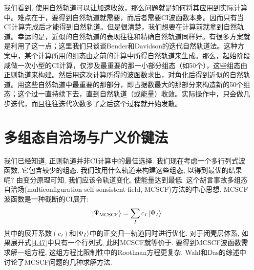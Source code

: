 我们看到, 使用自然轨道可以让加速收敛，那么问题就是如何将其应用到实际计算中。难点在于，要得到自然轨道就需要，而后者需要CI波函数本身。因而只有当CI计算完成后才能得到自然轨道。但是很清楚，我们想要在计算前就拿到自然轨道。幸运的是，近似的自然轨道的表现往往和精确自然轨道同样好。有很多方案就是利用了这一点；这里我们只谈谈Bender和Davidson的迭代自然轨道法。这种方案中，某个计算所用的组态由之前的计算中所得自然轨道来生成。那么，起始阶段咸做一次小型的CI计算，仅涉及最重要的那一小部分组态（如50个），这些组态由正则\hft 轨道来构建。然后用这次计算所得的波函数求出，对角化后得到近似的自然轨道。用这些自然轨道中最重要的那部分，即占据数最大的那部分来构造新的50个组态；这个过一直持续下去，直到自然轨道（或能量）收敛。实际操作中，只会做几步迭代，而且往往迭代次数多了之后这个过程就开始发散。
\section{多组态自洽场与广义价键法}
我们已经知道, 正则\hft 轨道并非CI计算中的最佳选择. 我们现在考虑一个多行列式波函数, 它包含较少的组态. 我们改用什么轨道来构建这些组态, 以得到最优的结果呢? 由变分原理可知, 我们应该令轨道变化, 使能量达到最低. 这个胡言事故多组态自洽场(multiconfiguration self-sonsistent field, MCSCF)方法的中心思想. MCSCF波函数是一种截断的CI展开:
\begin{align}
\Ket{\Psi_\mathrm{MCSCF}} = \sum_I c_I\Ket{\Psi_I}
\label{4.47}
\end{align}
其中的展开系数$(c_I)$和$\Ket{\Psi_I}$中的正交归一轨道同时进行优化. 对于闭壳层体系, 如果展开式\eqref{4.47}中只有一个行列式, 此时MCSCF就等价于\hft. 要得到MCSCF波函数需求解一组方程, 这组方程比限制性\hft 中的Roothaan方程更复杂. Wahl和Das的综述中讨论了MCSCF问题的几种求解方法.

